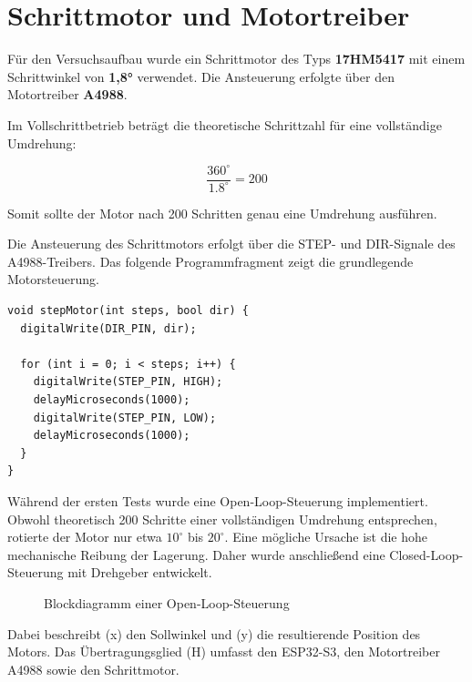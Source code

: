 \documentclass[a4paper,12pt]{article}
\begin{document}
\section{Schrittmotor und Motortreiber}

Für den Versuchsaufbau wurde ein Schrittmotor des Typs \textbf{17HM5417} mit einem Schrittwinkel von \textbf{1,8°} verwendet. Die Ansteuerung erfolgte über den Motortreiber \textbf{A4988}.

Im Vollschrittbetrieb beträgt die theoretische Schrittzahl für eine vollständige Umdrehung:

\[
\frac{360^\circ}{1.8^\circ}=200
\]

Somit sollte der Motor nach 200 Schritten genau eine Umdrehung ausführen.


Die Ansteuerung des Schrittmotors erfolgt über die STEP- und DIR-Signale des A4988-Treibers.
Das folgende Programmfragment zeigt die grundlegende Motorsteuerung.

\begin{verbatim}
void stepMotor(int steps, bool dir) {
  digitalWrite(DIR_PIN, dir);

  for (int i = 0; i < steps; i++) {
    digitalWrite(STEP_PIN, HIGH);
    delayMicroseconds(1000);
    digitalWrite(STEP_PIN, LOW);
    delayMicroseconds(1000);
  }
}
\end{verbatim}


Während der ersten Tests wurde eine Open-Loop-Steuerung implementiert. Obwohl theoretisch 200 Schritte einer vollständigen Umdrehung entsprechen, rotierte der Motor nur etwa $10^\circ$ bis $20^\circ$. Eine mögliche Ursache ist die hohe mechanische Reibung der Lagerung. Daher wurde anschließend eine Closed-Loop-Steuerung mit Drehgeber entwickelt.

\begin{figure}[H]
\centering


\caption{Blockdiagramm einer Open-Loop-Steuerung}
\end{figure}

Dabei beschreibt (x) den Sollwinkel und (y) die resultierende Position des Motors. Das Übertragungsglied (H) umfasst den ESP32-S3, den Motortreiber A4988 sowie den Schrittmotor.
\end{document}
